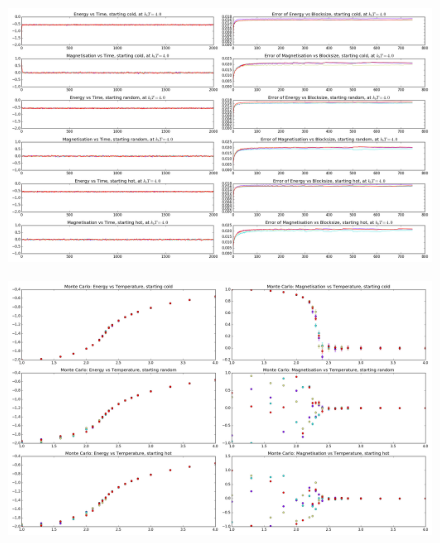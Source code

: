 \documentclass[11pt,notes]{beamer}
\begin{document}
\begin{frame}
	\begin{figure}
		\centering
		\includegraphics[width=1.0\textwidth]{Images/MC4}
	\end{figure}
\end{frame}
\begin{frame}
	\begin{figure}
		\centering
		\includegraphics[width=1.0\textwidth]{Images/MCT}
	\end{figure}
\end{frame}
\end{document}

